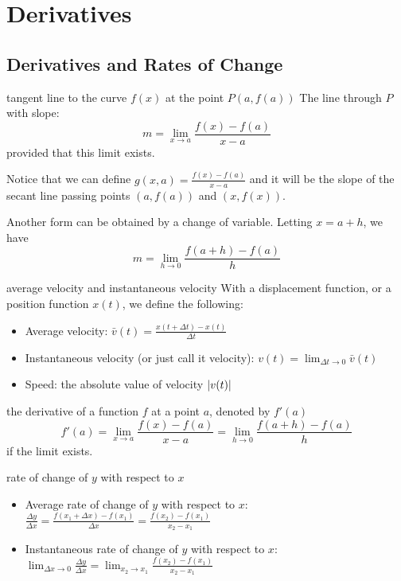 \documentclass[Calculus 1 Recitation.tex]{subfiles}
\begin{document}
\section{Derivatives}
\subsection{Derivatives and Rates of Change}
\begin{myleftlinebox}
	tangent line to the curve $f(x)$ at the point $P(a,f(a))$
	\tcblower
	The line through $P$ with slope:
	\[m=\lim_{x\to a} \frac{f(x)-f(a)}{x-a}\]
	provided that this limit exists. 
	
	Notice that we can define $g(x,a)=\frac{f(x)-f(a)}{x-a}$ and it will be the slope of the secant line passing points $(a,f(a))$ and $(x,f(x))$.

	Another form can be obtained by a change of variable. Letting $x=a+h$, we have
	\[m=\lim_{h\to 0}\frac{f(a+h)-f(a)}{h}\]
\end{myleftlinebox}

\begin{myleftlinebox}
	average velocity and instantaneous velocity
	\tcblower
	With a displacement function, or a position function $x(t)$, we define the following:
	\begin{itemize}
		\item Average velocity:
		\(\bar v(t)=\frac{x(t+\Delta t)-x(t)}{\Delta t}\)
		\item Instantaneous velocity (or just call it velocity):
		\(\displaystyle v(t)=\lim_{\Delta t\to 0}\bar v(t)\)
		\item Speed: the absolute value of velocity $\left\vert v(t)\right\vert$
	\end{itemize}	
\end{myleftlinebox}

\begin{myleftlinebox}
	the derivative of a function $f$ at a point $a$, denoted by $f'(a)$
	\tcblower
	\[f'(a)=\lim_{x\to a} \frac{f(x)-f(a)}{x-a}=\lim_{h\to 0}\frac{f(a+h)-f(a)}{h}\]
	if the limit exists.
\end{myleftlinebox}

\begin{myleftlinebox}
	rate of change of $y$ with respect to $x$
	\tcblower
	\begin{itemize}
		\item Average rate of change of $y$ with respect to $x$:
		\(\frac{\Delta y}{\Delta x}=\frac{f(x_1+\Delta x)-f(x_1)}{\Delta x}=\frac{f(x_2)-f(x_1)}{x_2-x_1}\)
		\item Instantaneous rate of change of $y$ with respect to $x$:
		 \(\displaystyle \lim_{\Delta x\to 0}\frac{\Delta y}{\Delta x}=\lim_{x_2\to x_1}\frac{f(x_2)-f(x_1)}{x_2-x_1}\)
	\end{itemize}	
\end{myleftlinebox}
\end{document}
